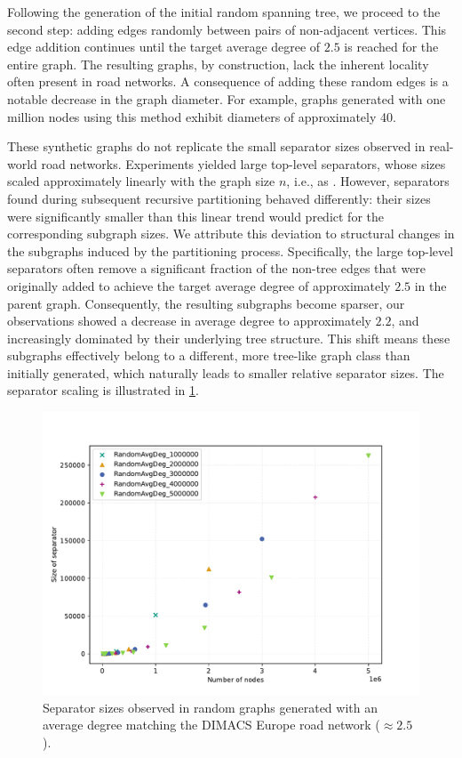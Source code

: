 Following the generation of the initial random spanning tree, we proceed to the second step: adding edges randomly between pairs of non-adjacent vertices.
This edge addition continues until the target average degree of \(2.5\) is reached for the entire graph.
The resulting graphs, by construction, lack the inherent locality often present in road networks.
A consequence of adding these random edges is a notable decrease in the graph diameter.
For example, graphs generated with one million nodes using this method exhibit diameters of approximately 40.

These synthetic graphs do not replicate the small separator sizes observed in real-world road networks.
Experiments yielded large top-level separators, whose sizes scaled approximately linearly with the graph size \(n\), i.e., as .
However, separators found during subsequent recursive partitioning behaved differently: their sizes were significantly smaller than this linear trend would predict for the corresponding subgraph sizes.
We attribute this deviation to structural changes in the subgraphs induced by the partitioning process.
Specifically, the large top-level separators often remove a significant fraction of the non-tree edges that were originally added to achieve the target average degree of approximately \(2.5\) in the parent graph.
Consequently, the resulting subgraphs become sparser, our observations showed a decrease in average degree to approximately \(2.2\), and increasingly dominated by their underlying tree structure.
This shift means these subgraphs effectively belong to a different, more tree-like graph class than initially generated, which naturally leads to smaller relative separator sizes.
The separator scaling is illustrated in \cref{fig:same_degree}.



\begin{figure}[tbhp]
	\centering
	\includegraphics[width=0.6\linewidth]{graphics/RandomAvgDeg2.5.pdf}
	\caption{Separator sizes observed in random graphs generated with an average degree matching the DIMACS Europe road network (\( \approx 2.5 \)).}
	\label{fig:same_degree}
\end{figure}

